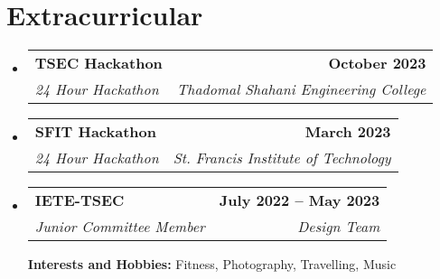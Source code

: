 \documentclass[letterpaper,11pt]{article}
\makeatletter
\newcommand{\resumeSubheading}[4]{
  \vspace{-2pt}\item
    \begin{tabular*}{1.0\textwidth}[t]{l@{\extracolsep{\fill}}r}
      \textbf{#1} & \textbf{\small #2} \\
      \textit{\small#3} & \textit{\small #4} \\
    \end{tabular*}\vspace{-7pt}
}
\newcommand{\resumeSubHeadingListStart}{\begin{itemize}[leftmargin=0.0in, label={}]}
\newcommand{\resumeSubHeadingListEnd}{\end{itemize}}
\newcommand{\resumeItemListStart}{\begin{itemize}}
\newcommand{\resumeItemListEnd}{\end{itemize}\vspace{-5pt}}
\makeatother
\begin{document}
\section{Extracurricular}
\resumeSubHeadingListStart

    \resumeSubheading
    {TSEC Hackathon}{October 2023}
    {24 Hour Hackathon}{Thadomal Shahani Engineering College}
    \vspace{-3pt}

    \resumeSubheading
    {SFIT Hackathon}{March 2023}
    {24 Hour Hackathon}{St. Francis Institute of Technology}
    \vspace{-3pt}

    \resumeSubheading
    {IETE-TSEC}{July 2022 -- May 2023}
    {Junior Committee Member}{Design Team}
    \resumeItemListStart
    \resumeItemListEnd
    \vspace{5pt}
    \textbf{Interests and Hobbies:} Fitness, Photography, Travelling, Music

\resumeSubHeadingListEnd
\end{document}
